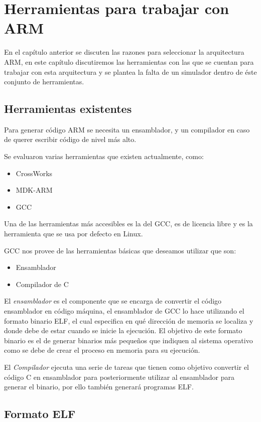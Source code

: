 \chapter{Herramientas para trabajar con ARM}\label{ch:herramientas_arm}

En el capítulo anterior se discuten las razones para seleccionar la
arquitectura \ac{ARM}, en este capítulo discutiremos las herramientas
con las que se cuentan para trabajar con esta arquitectura y se plantea
la falta de un simulador dentro de éste conjunto de herramientas.


\section{Herramientas existentes}

Para generar código \ac{ARM} se necesita un ensamblador, y un
compilador en caso de querer escribir código de nivel más alto. 

Se evaluaron varias herramientas que existen actualmente, como:
\begin{itemize}
\item CrossWorks 
\item MDK-ARM
\item \ac{GCC}
\end{itemize}
Una de las herramientas más accesibles es la del \ac{GCC}, es
de licencia libre y es la herramienta que se usa por defecto en Linux. 

\ac{GCC} nos provee de las herramientas básicas que deseamos utilizar
que son:
\begin{itemize}
\item Ensamblador
\item Compilador de C
\end{itemize}
El \emph{ensamblador} es el componente que se encarga de convertir
el código ensamblador en código máquina, el ensamblador de \ac{GCC}
lo hace utilizando el formato binario \ac{ELF}, el cual especifica
en qué dirección de memoria se localiza y donde debe de estar
cuando se inicie la ejecución. El objetivo de este formato binario
es el de generar binarios más pequeños que indiquen al sistema
operativo como se debe de crear el proceso en memoria para su ejecución.

El \emph{Compilador} ejecuta una serie de tareas que tienen como objetivo
convertir el código C en ensamblador para posteriormente utilizar
al ensamblador para generar el binario, por ello también generará
programas \ac{ELF}. 


\section{Formato ELF}

